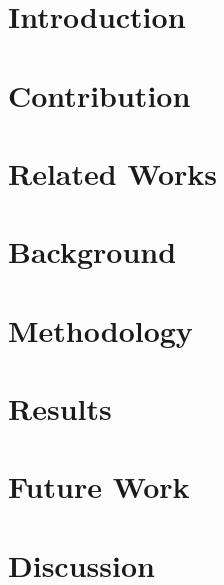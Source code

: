 \documentclass[acmtog, screen, balance]{acmart}
\begin{document}
\maketitle


\section{Introduction} \label{introduction}



\section{Contribution}


\section{Related Works}


\section{Background}


\section{Methodology}


\section{Results}


\section{Future Work}


\section{Discussion}

\end{document}
